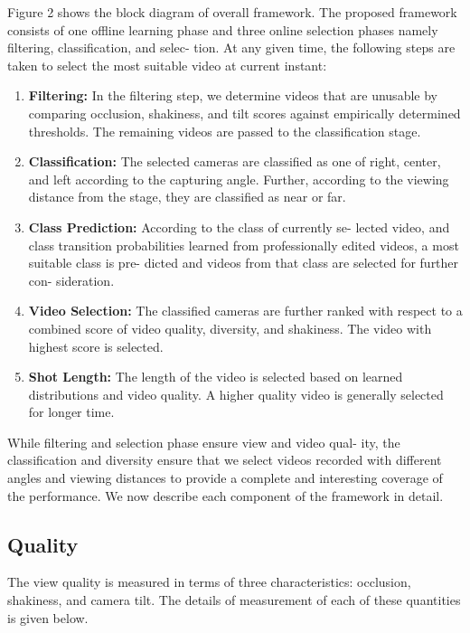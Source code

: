 \documentclass{sig-alternate}
\begin{document}
Figure 2 shows the block diagram of overall framework. The
proposed framework consists of one offline learning phase and three
online selection phases namely filtering, classification, and selec-
tion. At any given time, the following steps are taken to select the
most suitable video at current instant:
\begin{enumerate}
\item \textbf{Filtering:} In the filtering step, we determine videos that are
unusable by comparing occlusion, shakiness, and tilt scores
against empirically determined thresholds. The remaining
videos are passed to the classification stage.
\item \textbf{Classification:} The selected cameras are classified as one
of right, center, and left according to the capturing angle.
Further, according to the viewing distance from the stage,
they are classified as near or far.
\item \textbf{Class Prediction:} According to the class of currently se-
lected video, and class transition probabilities learned from
professionally edited videos, a most suitable class is pre-
dicted and videos from that class are selected for further con-
sideration.
\item \textbf{Video Selection:} The classified cameras are further ranked
with respect to a combined score of video quality, diversity,
and shakiness. The video with highest score is selected.
\item \textbf{Shot Length:} The length of the video is selected based on
learned distributions and video quality. A higher quality video
is generally selected for longer time.
\end{enumerate}

While filtering and selection phase ensure view and video qual-
ity, the classification and diversity ensure that we select videos
recorded with different angles and viewing distances to provide a
complete and interesting coverage of the performance. We now
describe each component of the framework in detail.

\subsection{Quality}
The view quality is measured in terms of three characteristics:
occlusion, shakiness, and camera tilt. The details of measurement
of each of these quantities is given below.
\end{document}
